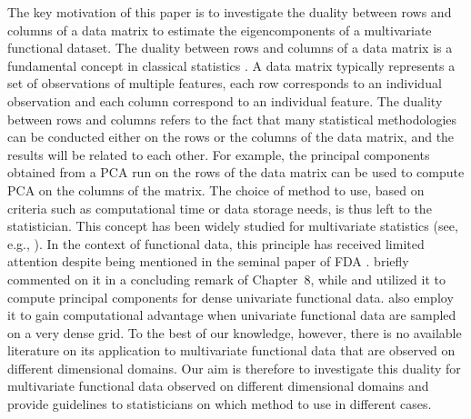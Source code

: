 The key motivation of this paper is to investigate the duality between rows and columns of a data matrix to estimate the eigencomponents of a multivariate functional dataset. The duality between rows and columns of a data matrix is a fundamental concept in classical statistics \citep{escofierTraitementSimultaneVariables1979,saportaSimultaneousAnalysisQualitative1990}. A data matrix typically represents a set of observations of multiple features, each row corresponds to an individual observation and each column correspond to an individual feature. The duality between rows and columns refers to the fact that many statistical methodologies can be conducted either on the rows or the columns of the data matrix, and the results will be related to each other. For example, the principal components obtained from a PCA run on the rows of the data matrix can be used to compute PCA on the columns of the matrix. The choice of method to use, based on criteria such as computational time or data storage needs, is thus left to the statistician. This concept has been widely studied for multivariate statistics (see, e.g., \cite{pagesMultipleFactorAnalysis2014,hardleAppliedMultivariateStatistical2019}). In the context of functional data, this principle has received limited attention despite being mentioned in the seminal paper of FDA \citep{ramsayWhenDataAre1982a}. \cite{ramsayFunctionalDataAnalysis2005} briefly commented on it in a concluding remark of Chapter~8, while \cite{kneipInferenceDensityFamilies2001} and \cite{benkoCommonFunctionalPrincipal2009} utilized it to compute principal components for dense univariate functional data. \cite{chenQuantifyingInfiniteDimensionalData2017} also employ it to gain computational advantage when univariate functional data are sampled on a very dense grid. To the best of our knowledge, however, there is no available literature on its application to multivariate functional data that are observed on different dimensional domains. Our aim is therefore to investigate this duality for multivariate functional data observed on different dimensional domains and provide guidelines to statisticians on which method to use in different cases.


